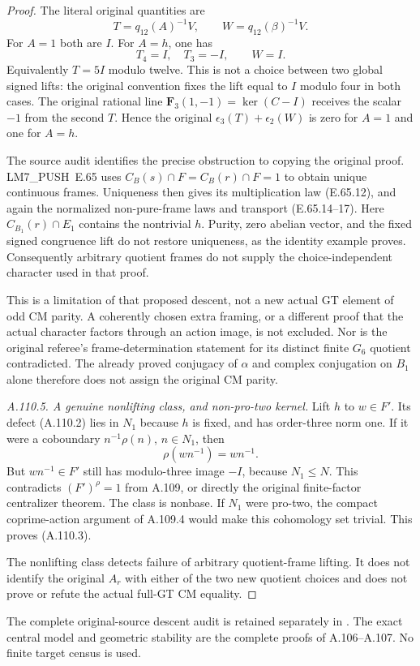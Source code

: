 \begin{proof}
The literal original quantities are
\[
 T=q_{12}(A)^{-1}V,\qquad W=q_{12}(\beta)^{-1}V.
 \tag{A.110.9}
\]
For \(A=1\) both are \(I\). For \(A=h\), one has
\[
 T_4=I,\quad T_3=-I,\qquad W=I.
 \]
Equivalently \(T=5I\) modulo twelve. This is not a choice between
two global signed lifts: the original convention fixes the lift
equal to \(I\) modulo four in both cases.
The original rational line
\(\mathbf F_3(1,-1)=\ker(C-I)\) receives the scalar \(-1\) from
the second \(T\). Hence the original
\(\epsilon_3(T)+\epsilon_2(W)\) is zero for \(A=1\) and one for
\(A=h\).

The source audit identifies the precise obstruction to copying
the original proof. LM7\_PUSH~E.65 uses
\(C_B(s)\cap F=C_B(r)\cap F=1\) to obtain unique continuous frames.
Uniqueness then gives its multiplication law (E.65.12), and again
the normalized non-pure-frame laws and transport (E.65.14--17).
Here \(C_{B_1}(r)\cap E_1\) contains the nontrivial \(h\).
Purity, zero abelian vector, and the fixed signed congruence lift
do not restore uniqueness, as the identity example proves.
Consequently arbitrary quotient frames do not supply the
choice-independent character used in that proof.

This is a limitation of that proposed descent, not a new actual
GT element of odd CM parity. A coherently chosen extra framing,
or a different proof that the actual character factors through
an action image, is not excluded. Nor is the original referee's
frame-determination statement for its distinct finite \(G_6\)
quotient contradicted. The already proved conjugacy of
\(\alpha\) and complex conjugation on \(B_1\) alone therefore
does not assign the original CM parity.

\emph{A.110.5. A genuine nonlifting class, and non-pro-two kernel.}
Lift \(h\) to \(w\in F'\). Its defect (A.110.2) lies in \(N_1\)
because \(h\) is fixed, and has order-three norm one.
If it were a coboundary \(n^{-1}\rho(n)\), \(n\in N_1\), then
\[
 \rho(wn^{-1})=wn^{-1}.
 \]
But \(wn^{-1}\in F'\) still has modulo-three image \(-I\), because
\(N_1\le N\). This contradicts \((F')^\rho=1\) from A.109,
or directly the original finite-factor centralizer theorem.
The class is nonbase. If \(N_1\) were pro-two, the compact
coprime-action argument of A.109.4 would make this cohomology
set trivial. This proves (A.110.3).

The nonlifting class detects failure of arbitrary quotient-frame
lifting. It does not identify the original \(A_r\) with either
of the two new quotient choices and does not prove or refute the
actual full-GT CM equality.
\end{proof}

The complete original-source descent audit is retained separately in
.
The exact central model and geometric stability are the complete
proofs of A.106--A.107. No finite target census is used.

